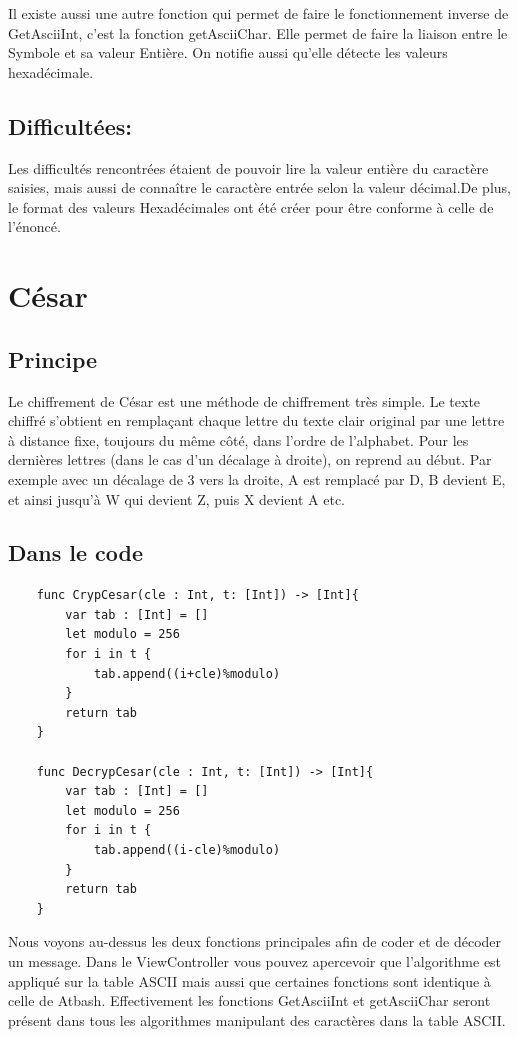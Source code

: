 \documentclass{article}
\begin{document}
 Il existe aussi une autre fonction qui permet de faire le fonctionnement inverse de GetAsciiInt, c'est la fonction getAsciiChar. Elle permet de faire la liaison entre le Symbole et sa valeur Entière. On notifie aussi qu'elle détecte les valeurs hexadécimale.

\subsection{Difficultées:}

Les difficultés rencontrées étaient de pouvoir lire la valeur entière du caractère saisies, mais aussi de connaître le caractère entrée selon la valeur décimal.\newline De plus, le format des valeurs Hexadécimales ont été créer pour être conforme à celle de l'énoncé.
\newpage
\section{César}
\subsection{Principe}
Le chiffrement de César est une méthode de chiffrement très simple.
Le texte chiffré s'obtient en remplaçant chaque lettre du texte clair original par une lettre à distance fixe, toujours du même côté, dans l'ordre de l'alphabet. Pour les dernières lettres (dans le cas d'un décalage à droite), on reprend au début. Par exemple avec un décalage de 3 vers la droite, A est remplacé par D, B devient E, et ainsi jusqu'à W qui devient Z, puis X devient A etc.

\subsection{Dans le code}
\begin{verbatim}
    func CrypCesar(cle : Int, t: [Int]) -> [Int]{
        var tab : [Int] = []
        let modulo = 256
        for i in t {
            tab.append((i+cle)%modulo)
        }
        return tab
    }
    
    func DecrypCesar(cle : Int, t: [Int]) -> [Int]{
        var tab : [Int] = []
        let modulo = 256
        for i in t {
            tab.append((i-cle)%modulo)
        }
        return tab
    }
\end{verbatim}
Nous voyons au-dessus les deux fonctions principales afin de coder et de décoder un message.
Dans le ViewController vous pouvez apercevoir que l'algorithme est appliqué sur la table ASCII mais aussi que certaines fonctions sont identique à celle de Atbash.
\newline Effectivement les fonctions GetAsciiInt et getAsciiChar seront présent dans tous les algorithmes manipulant des caractères dans la table ASCII.
\end{document}
